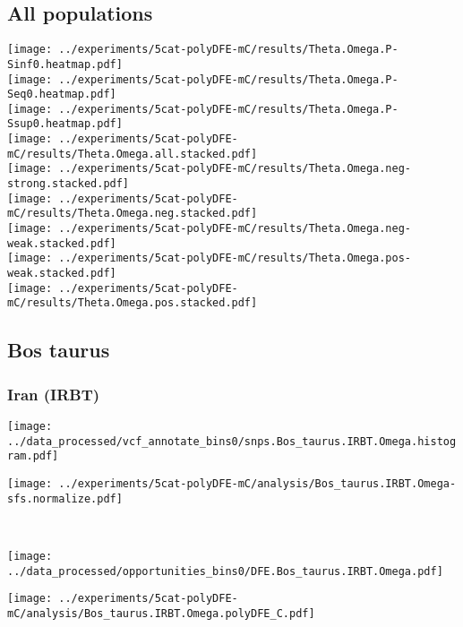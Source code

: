 \subsection{All populations}
\begin{center}
    \texttt{[image: ../experiments/5cat-polyDFE-mC/results/Theta.Omega.P-Sinf0.heatmap.pdf]} \\
    \texttt{[image: ../experiments/5cat-polyDFE-mC/results/Theta.Omega.P-Seq0.heatmap.pdf]} \\
    \texttt{[image: ../experiments/5cat-polyDFE-mC/results/Theta.Omega.P-Ssup0.heatmap.pdf]} \\
    \texttt{[image: ../experiments/5cat-polyDFE-mC/results/Theta.Omega.all.stacked.pdf]} \\
    \texttt{[image: ../experiments/5cat-polyDFE-mC/results/Theta.Omega.neg-strong.stacked.pdf]} \\
    \texttt{[image: ../experiments/5cat-polyDFE-mC/results/Theta.Omega.neg.stacked.pdf]} \\
    \texttt{[image: ../experiments/5cat-polyDFE-mC/results/Theta.Omega.neg-weak.stacked.pdf]} \\
    \texttt{[image: ../experiments/5cat-polyDFE-mC/results/Theta.Omega.pos-weak.stacked.pdf]} \\
    \texttt{[image: ../experiments/5cat-polyDFE-mC/results/Theta.Omega.pos.stacked.pdf]}
\end{center}

\subsection{Bos taurus}

\subsubsection{Iran (IRBT)}

\begin{minipage}{0.49\linewidth}
    \texttt{[image: ../data\_processed/vcf\_annotate\_bins0/snps.Bos\_taurus.IRBT.Omega.histogram.pdf]}
\end{minipage}
\begin{minipage}{0.49\linewidth}
    \texttt{[image: ../experiments/5cat-polyDFE-mC/analysis/Bos\_taurus.IRBT.Omega-sfs.normalize.pdf]}
\end{minipage}
\\
\begin{minipage}{0.49\linewidth}
    \texttt{[image: ../data\_processed/opportunities\_bins0/DFE.Bos\_taurus.IRBT.Omega.pdf]}
\end{minipage}
\begin{minipage}{0.49\linewidth}
    \texttt{[image: ../experiments/5cat-polyDFE-mC/analysis/Bos\_taurus.IRBT.Omega.polyDFE\_C.pdf]}
\end{minipage}
\\


